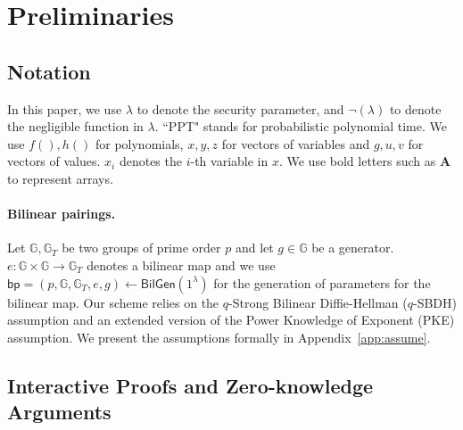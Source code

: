 \section{Preliminaries}
\label{sec::prelim}

\subsection{Notation}

In this paper, we use $\lambda$ to denote the security parameter, and $\neg(\lambda)$ to denote the negligible function in $\lambda$. ``PPT" stands for probabilistic polynomial time. We use $f(),h()$ for polynomials, $x,y,z$ for vectors of variables and $g,u,v$ for vectors of values. $x_i$ denotes the $i$-th variable in $x$. We use bold letters such as $\textbf{A}$ to represent arrays.

\paragraph{Bilinear pairings.} Let $\mathbb{G}, \mathbb{G}_T$ be two groups of prime order $p$ and let $g\in\mathbb{G}$ be a generator. $e: \mathbb{G}\times\mathbb{G}\rightarrow\mathbb{G}_T$ denotes a bilinear map and we use $\mathsf{bp}=(p,\mathbb{G},\mathbb{G}_T,e,g)\leftarrow\mathsf{BilGen}(1^\lambda)$ for the generation of parameters for the bilinear map. Our scheme relies on the $q$-Strong Bilinear Diffie-Hellman ($q$-SBDH) assumption and an extended version of the Power Knowledge of Exponent (PKE) assumption. We present the assumptions formally in Appendix~\ref{app:assume}.



\subsection{Interactive Proofs and Zero-knowledge Arguments}

